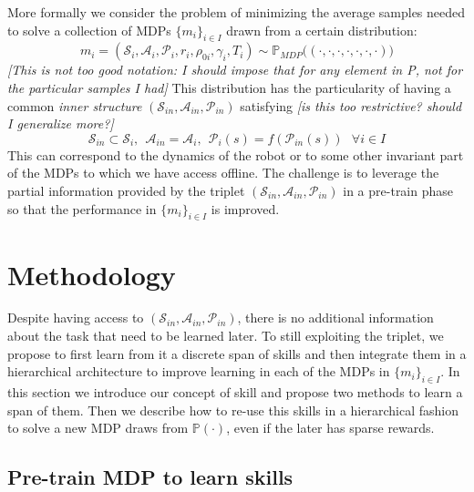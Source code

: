 \documentclass{article} %
\begin{document}
More formally we consider the problem of minimizing the average samples needed to solve a collection of MDPs $\{m_i\}_{i\in I}$ drawn from a certain distribution:
\begin{equation}
    m_i = (\mathcal{S}_i, \mathcal{A}_i, \mathcal{P}_i, r_i, \rho_{0i}, \gamma_i, T_i) \sim \mathbb{P}_{MDP}\big( (\cdot, \cdot, \cdot, \cdot, \cdot, \cdot, \cdot) \big)
\end{equation}
\textit{[This is not too good notation: I should impose that for any element in P, not for the particular samples I had]}
This distribution has the particularity of having a common \textit{inner structure} $(\mathcal{S}_{in}, \mathcal{A}_{in}, \mathcal{P}_{in})$ satisfying \textit{[is this too restrictive? should I generalize more?]}
$$\mathcal{S}_{in} \subset \mathcal{S}_i,~~ \mathcal{A}_{in} = \mathcal{A}_i,~~ \mathcal{P}_i(s)=f(\mathcal{P}_{in}(s))~~~ \forall i\in I$$
This can correspond to the dynamics of the robot or to some other invariant part of the MDPs to which we have access offline. The challenge is to leverage the partial information provided by the triplet $(\mathcal{S}_{in}, \mathcal{A}_{in}, \mathcal{P}_{in})$ in a pre-train phase so that the performance in $\{m_i\}_{i\in I}$ is improved.

\section{Methodology}

Despite having access to $(\mathcal{S}_{in}, \mathcal{A}_{in}, \mathcal{P}_{in})$, there is no additional information about the task that need to be learned later. To still exploiting the triplet, we propose to first learn from it a discrete span of skills and then integrate them in a hierarchical architecture to improve learning in each of the MDPs in $\{m_i\}_{i\in I}$. In this section we introduce our concept of skill and propose two methods to learn a span of them. Then we describe how to re-use this skills in a hierarchical fashion to solve a new MDP draws from $\mathbb{P}(\cdot)$, even if the later has sparse rewards.

\subsection{Pre-train MDP to learn skills}
\end{document}
